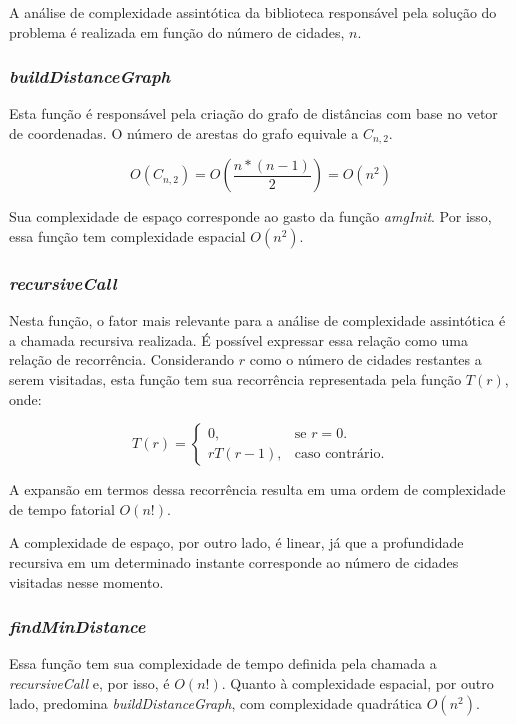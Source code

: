 \documentclass[10pt,a4paper]{article}
\numberwithin{equation}{section}
\begin{document}
A análise de complexidade assintótica da biblioteca responsável pela solução do problema é realizada em função do número de cidades, $n$.

\subsubsection{\emph{buildDistanceGraph}}

Esta função é responsável pela criação do grafo de distâncias com base no vetor de coordenadas. O número de arestas do grafo equivale a $C_{n,2}$.

\[
    O(C_{n,2}) = O(\frac{n*(n-1)}{2}) = O(n^2)
\]

Sua complexidade de espaço corresponde ao gasto da função \emph{amgInit}. Por isso, essa função tem complexidade espacial $O(n^2)$.

\subsubsection{\emph{recursiveCall}}

Nesta função, o fator mais relevante para a análise de complexidade assintótica é a chamada recursiva realizada. É possível expressar essa relação como uma relação de recorrência. Considerando $r$ como o número de cidades restantes a serem visitadas, esta função tem sua recorrência representada pela função $T(r)$, onde:

\[
    T(r)=\begin{cases}
        0, & \text{se $r = 0$.}\\
        rT(r-1), & \text{caso contrário.} 
    \end{cases}
\]

A expansão em termos dessa recorrência resulta em uma ordem de complexidade de tempo fatorial $O(n!)$.

A complexidade de espaço, por outro lado, é linear, já que a profundidade recursiva em um determinado instante corresponde ao número de cidades visitadas nesse momento.

\subsubsection{\emph{findMinDistance}}

Essa função tem sua complexidade de tempo definida pela chamada a \emph{recursiveCall} e, por isso, é $O(n!)$. Quanto à complexidade espacial, por outro lado, predomina \emph{buildDistanceGraph}, com complexidade quadrática $O(n^2)$. 
\end{document}
